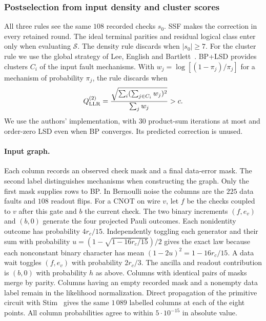 \documentclass[10pt,twocolumn]{article}
\theoremstyle{definition}
\begin{document}
\subsubsection{Postselection from input density and cluster scores}\label{app:input-postselection}
All three rules see the same $108$ recorded checks $s_0$. SSF makes
the correction in every retained round. The ideal terminal parities
and residual logical class enter only when evaluating $\mathcal S$.
The density rule discards when $|s_0|\ge7$.
For the cluster rule we use the global strategy of Lee, English and
Bartlett~\cite[Defs.~1--2]{LEB26}. BP+LSD provides clusters $C_i$
of the input fault mechanisms. With $w_j=\log[(1-\pi_j)/\pi_j]$ for
a mechanism of probability $\pi_j$, the rule discards when
\[
 Q_{\rm LLR}^{(2)}
 =\frac{\sqrt{\sum_i(\sum_{j\in C_i} w_j)^2}}{\sum_j w_j}>c .
\]
We use the authors' implementation, with 30 product-sum iterations
at most and order-zero LSD even when BP converges. Its predicted
correction is unused.

\paragraph{Input graph.}
Each column records an observed check mask and a final data-error
mask. The second label distinguishes mechanisms when constructing the
graph. Only the first mask supplies rows to BP. In Bernoulli noise
the columns are the $225$ data faults and $108$ readout flips.
For a CNOT on wire $v$, let $f$ be the checks coupled to $v$ after
this gate and $b$ the current check. The two binary increments
$(f,e_v)$ and $(b,0)$ generate the four projected Pauli outcomes.
Each nonidentity outcome has probability $4r_c/15$. Independently
toggling each generator and their sum with probability
$u=(1-\sqrt{1-16r_c/15})/2$ gives the exact law because each
nonconstant binary character has mean $(1-2u)^2=1-16r_c/15$.
A data wait toggles $(f,e_v)$ with probability $2r_c/3$.
The ancilla and readout contribution is $(b,0)$ with probability $h$
as above. Columns with identical pairs of masks merge by parity.
Columns having an empty recorded mask and a nonempty data label
remain in the likelihood normalization. Direct propagation of the
primitive circuit with Stim~\cite{Gidney21} gives the same $1\,089$
labelled columns at each of the eight points. All column
probabilities agree to within $5\cdot10^{-15}$ in absolute value.
\end{document}
